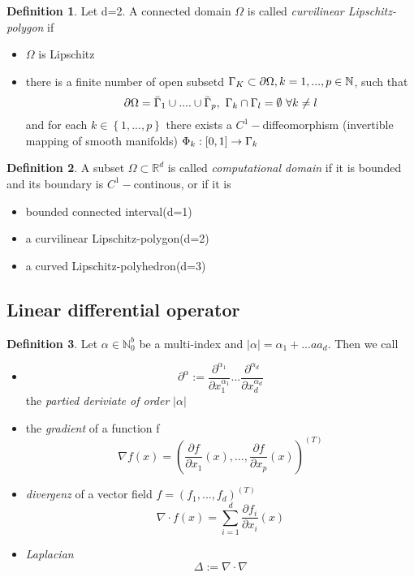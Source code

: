 \documentclass[ngerman]{article}
\theoremstyle{definition}
\newtheorem*{defi}{Definition}
\theoremstyle{remark}
\newcommand{\f}[2]{\frac{#1}{#2}}							%
\newcommand{\p}{\partial}
\newcommand{\NN}{\mathbb{N}}			%
\newcommand{\RR}{\mathbb{R}}			%
\renewcommand{\aa}{\alpha}		%
\newcommand{\OO}{\Omega}
\newcommand{\tri}{\nabla}
\begin{document}
\begin{defi}
  Let d=2. A connected domain $\OO$ is called \emph{curvilinear Lipschitz-polygon} if 
  \begin{itemize}
  \item $\OO$ is Lipschitz
  \item there is a finite number of open subsetd $\GG_K\subset \p\OO, k=1,...,p\in \NN$, such that 
    $$\p\OO=\bar\GG_1\cup....\cup \bar\GG_p,\ \GG_k\cap \GG_l=\emptyset \ \forall k\neq l$$
    and for each $k\in\left\{1,...,p\right\}$ there exists a $C^1-$diffeomorphism (invertible mapping of smooth manifolds) $\Phi_k : [0,1]\to \Gamma_k$
  \end{itemize}
\end{defi}
\begin{defi}
  A subset $\OO\subset \RR^d$ is called \emph{computational domain} if it is bounded and its boundary is $C^1-$continous, or if it is 
  \begin{itemize}
  \item bounded connected interval(d=1)
  \item a curvilinear Lipschitz-polygon(d=2)
  \item a curved Lipschitz-polyhedron(d=3)
  \end{itemize}
\end{defi}
\subsection{Linear differential operator}
\begin{defi}
  Let $\aa \in \NN_0 ^b$ be a multi-index and $|\aa| = \aa_1+...aa_d$. Then we call 
  \begin{itemize}
  \item $$\p^\aa:=\f{\p^{\aa_1}}{\p x_1^{\aa_1}}...\f{\p^{\aa_d}}{\p x_d^{\aa_d}}$$
    the \emph{partied deriviate of order} $|\aa|$\\
  \item the \emph{gradient} of a function f 
    $$\nabla f (x) = (\f{\p f}{\p x_1}(x),...,\f{\p f}{\p x_p}(x))^{(T)}$$
  \item \emph{divergenz} of a vector field $ f=(f_1,...,f_d)^{(T)}$
    $$\nabla \cdot f(x) = \sum_{i=1}^d \f{\p f_i}{\p x_i}(x)$$
  \item \emph{Laplacian}
    $$\Delta :=\tri \cdot \tri$$
  \end{itemize}
\end{defi}
\end{document}

